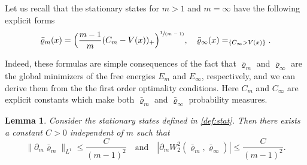 \documentclass[11pt]{article}
\makeatletter
\numberwithin{equation}{section}
\newcommand{\spfrac}[2]{\sfrac{#1}{(#2)}}
\DeclareRobustCommand{\mathbbm}[1]{\csname jepbb@#1\endcsname}
\let\mathds\mathbbm
\newcommand{\Bprt}[1]{\Bigl(#1\Bigr)}
\theoremstyle{plain}
\newtheorem{lemma}[theorem]{Lemma}
\theoremstyle{remark}
\makeatother
\begin{document}
Let us recall that the stationary states for $m>1$ and $m=\infty$ have the following explicit forms
\begin{equation}\label{def:stat}
\bar\varrho_m(x) = \Bprt{\frac{m-1}{m}(C_m - V(x))_+}^{\spfrac{1}{m-1}}, \quad \bar\varrho_\infty(x)=\mathds{1}_{\{C_\infty > V(x)\}}.
\end{equation}
{Indeed, these formulas are simple consequences of the fact that $\bar\varrho_m$ and $\bar\varrho_{\infty}$ are the global minimizers of the free energies $E_{m}$ and $E_{\infty}$, respectively, and we can derive them from the the first order optimality conditions. Here $C_{m}$ and $C_{\infty}$ are explicit constants which make both $\bar\varrho_m$ and $\bar\varrho_\infty$ probability measures.
\begin{lemma}\label{lem:sec5}
Consider the stationary states defined in \eqref{def:stat}. Then there exists a constant $C>0$ independent of $m$ such that
\[
\|\partial_m \bar\varrho_m\|_{L^1} \leq \frac{C}{(m-1)^2}\quad\text{and}\quad \left| \partial_m W_2^2(\bar\varrho_m, \bar\varrho_\infty)\right| \leq \frac{C}{(m-1)^2}.
\]
\end{lemma}
}
\end{document}
